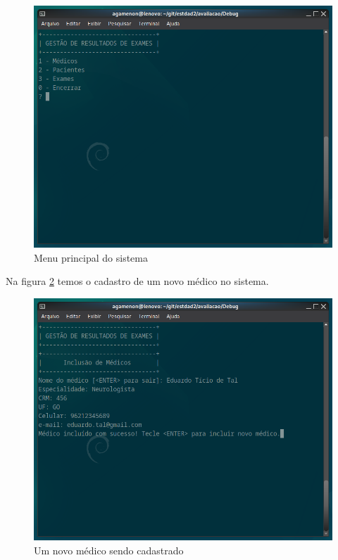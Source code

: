 \documentclass[a4paper,12pt,article]{abntex2}
\begin{document}
      \begin{figure}[h]
        \centering
        \includegraphics[scale=0.25]{./fig/menuprincipal}
        \caption{Menu principal do sistema}
        \label{menuprincipal}
      \end{figure}

      Na figura \ref{cadastromedico} temos o cadastro de um novo médico no sistema.
      
      \begin{figure}[h]
        \centering
        \includegraphics[scale=0.25]{./fig/cadastromedico}
        \caption{Um novo médico sendo cadastrado}
        \label{cadastromedico}
      \end{figure}
\end{document}
